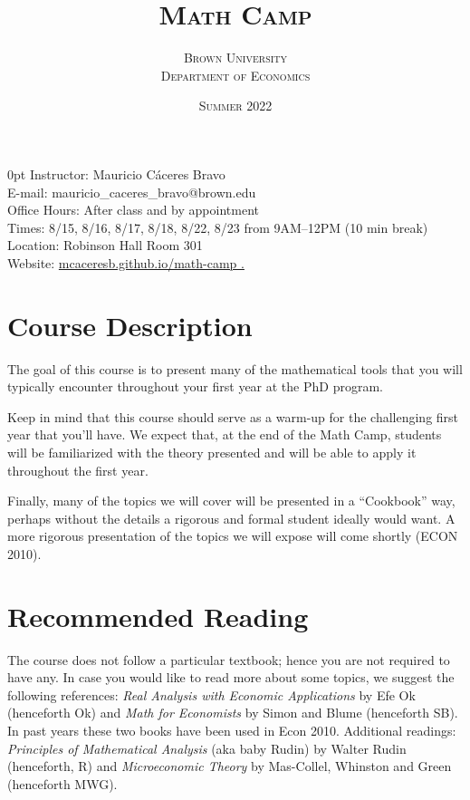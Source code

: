 \documentclass[11pt]{article}
\title{\bfseries\scshape Math Camp}
\author{\scshape Brown University \\ \scshape Department of Economics}
\date{\scshape Summer 2022}
\renewcommand{\displayoptions}{\maketitle\pagenumbering{arabic}}
\begin{document}
\displayoptions

{
  \bfseries
  \begin{adjustwidth}{\parindent}{0pt}
    Instructor: Mauricio C\'aceres Bravo \\
    E-mail: mauricio\_caceres\_bravo@brown.edu \\
    Office Hours: After class and by appointment \\[12pt]
    Times: 8/15, 8/16, 8/17, 8/18, 8/22, 8/23 from 9AM--12PM (10 min break) \\
    Location: Robinson Hall Room 301 \\
    Website: \href{https://mcaceresb.github.io/math-camp}{mcaceresb.github.io/math-camp \ExternalLink.}
  \end{adjustwidth}
  \vspace{12pt}
}

\section{Course Description}
\label{sec:course_description}

The goal of this course is to present many of the mathematical tools that you will typically encounter throughout your first year at the PhD program.

Keep in mind that this course should serve as a warm-up for the challenging first year that you’ll have. We expect that, at the end of the Math Camp, students will be familiarized with the theory presented and will be able to apply it throughout the first year.

Finally, many of the topics we will cover will be presented in a ``Cookbook'' way, perhaps without the details a rigorous and formal student ideally would want. A more rigorous presentation of the topics we will expose will come shortly (ECON 2010).

\section{Recommended Reading}
\label{sec:recommended_reading}

The course does not follow a particular textbook; hence you are not required to have any. In case you would like to read more about some topics, we suggest the following references: \textit{Real Analysis with Economic Applications} by Efe Ok (henceforth Ok) and \textit{Math for Economists} by Simon and Blume (henceforth SB). In past years these two books have been used in Econ 2010. Additional readings: \textit{Principles of Mathematical Analysis} (aka baby Rudin) by Walter Rudin (henceforth, R) and \textit{Microeconomic Theory} by Mas-Collel, Whinston and Green (henceforth MWG).
\end{document}
